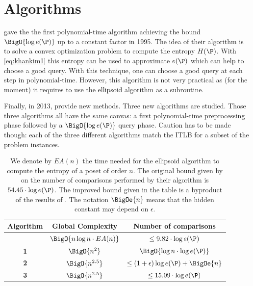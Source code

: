 
\section{Algorithms}


\citet*{kahn:1995} gave the the first polynomial-time algorithm achieving the
bound $\BigO{\log e(\P)}$ up to a constant factor in 1995. The idea of their
algorithm is to solve a convex optimization problem to compute the entropy
\(H(\P)\). With \ref{eq:khankim1} this entropy can be used to approximate
\(e(\P)\) which can help to choose a good query. With this technique, one can
choose a good query at each step in polynomial-time. However, this algorithm
is not very practical as (for the moment) it requires to use the ellipsoid
algorithm as a subroutine.

Finally, in 2013, \citet*{cardinal:2013} provide new methods. Three new
algorithms are studied. Those three algorithms all have the same canvas: a
first polynomial-time preprocessing phase followed by a $\BigO{\log e(\P)}$
query phase. Caution has to be made though: each of the three different
algorithms match the ITLB for a subset of the problem instances.

\begin{table}
	\begin{center}
	\caption{We denote by $E A(n)$ the time needed for the ellipsoid algorithm
to compute the entropy of a poset of order $n$. The original bound given by
\citet*{kahn:1995} on the number of comparisons performed by their algorithm is
$54.45 \cdot \log e(\P)$. The improved bound given in the table is a byproduct
of the results of \citet*{cardinal:2013}. The notation $\BigOe{n}$ means
that the hidden constant may depend on $\epsilon$.}
	\label{tree:supi:table/jcardin}
	\begin{tabular}{|c|c|c|}

	\hline
	Algorithm & Global Complexity & Number of comparisons\\\hline\hline
	\citet*{kahn:1995} & $\BigO{n \log n \cdot E A(n)}$ & $\leq 9.82 \cdot \log
e(\P)$\\\hline\hline
	\citet*{cardinal:2013} \textbf{1} & $ \BigO{n^{2}} $ & $\BigO{\log n \cdot
\log e(\P)}$ \\\hline
	\citet*{cardinal:2013} \textbf{2} & $ \BigO{n^{2.5}} $ & $\leq (1 +
\epsilon) \log e(\P) + \BigOe{n}$ \\\hline
	\citet*{cardinal:2013} \textbf{3} & $ \BigO{n^{2.5}} $ & $\leq 15.09 \cdot
\log e(\P)$ \\\hline

	\end{tabular}
	\end{center}
\end{table}


